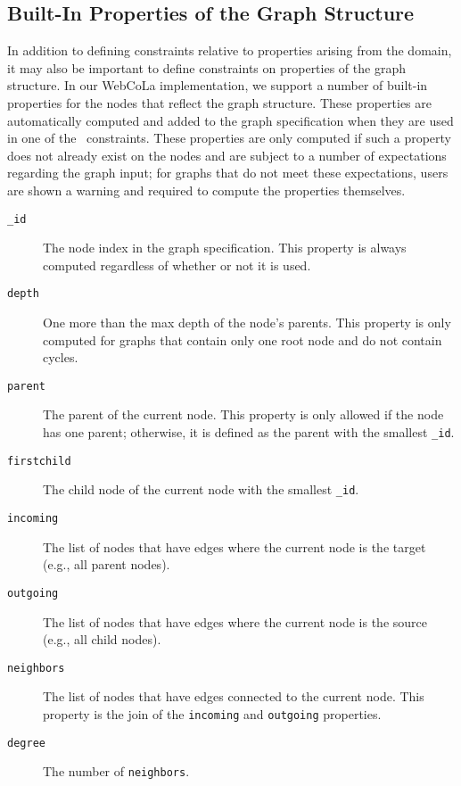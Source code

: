 \subsection{Built-In Properties of the Graph Structure}
In addition to defining constraints relative to properties arising from
the domain, it may also be important to define constraints on properties
of the graph structure. In our WebCoLa implementation, we support a 
number of built-in properties for the nodes that reflect the graph structure.
These properties are automatically computed and added to the graph 
specification when they are used in one of the \projectname\ constraints. 
These properties are only computed if such a property does not
already exist on the nodes and are subject to a number of expectations
regarding the graph input; for graphs that do not meet these expectations,
users are shown a warning and required to compute the properties
themselves.

\begin{description}
\item[\texttt{\_id}] The node index in the graph specification. This
  property is always computed regardless of whether or not it is used.
\item[\texttt{depth}] One more than the max depth of the node's
  parents. This property is only computed for graphs that contain only one
  root node and do not contain cycles. 
\item[\texttt{parent}] The parent of the current node. This property is
  only allowed if the node has one parent; otherwise, it is defined as the
  parent with the smallest \texttt{\_id}.
\item[\texttt{firstchild}] The child node of the current node with the smallest \texttt{\_id}.
\item[\texttt{incoming}] The list of nodes that have edges where the
  current node is the target (e.g., all parent nodes).
\item[\texttt{outgoing}] The list of nodes that have edges where the
  current node is the source (e.g., all child nodes).
\item[\texttt{neighbors}] The list of nodes that have edges connected to
  the current node. This property is the join of the \texttt{incoming} and
  \texttt{outgoing} properties.
\item[\texttt{degree}] The number of \texttt{neighbors}.
\end{description}

